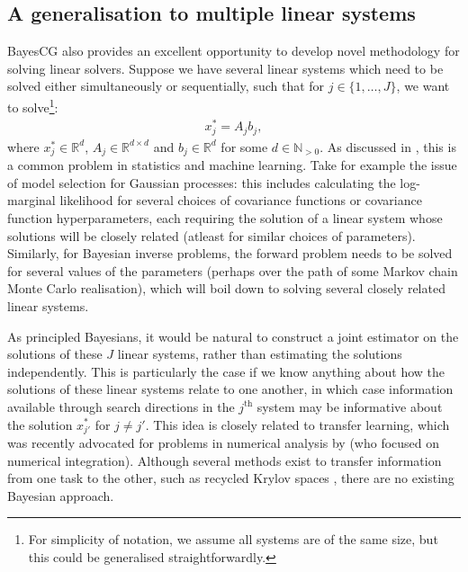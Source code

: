 \documentclass[twoside]{article}
\begin{document}


\subsection*{A generalisation to multiple linear systems}

BayesCG also provides an excellent opportunity to develop novel methodology for solving linear solvers. Suppose we have several linear systems which need to be solved either simultaneously or sequentially, such that for $j \in \{1,\ldots,J\}$, we want to solve\footnote{For simplicity of notation, we assume all systems are of the same size, but this could be generalised straightforwardly.}:
\begin{align*}
x_j^* = A_j b_j,  
\end{align*}
where $x_j^* \in \mathbb{R}^d$, $A_j \in \mathbb{R}^{d \times d}$ and $b_j \in \mathbb{R}^d$ for some $d \in \mathbb{N}_{> 0}$. As discussed in 
\cite{DeRoos2017}, this is a common problem in statistics and machine learning. Take for example the issue of model selection for Gaussian processes: this includes calculating the log-marginal likelihood for several choices of covariance functions or covariance function hyperparameters, each requiring the solution of a linear system whose solutions will be closely related (atleast for similar choices of parameters). Similarly, for Bayesian inverse problems, the forward problem needs to be solved for several values of the parameters (perhaps over the path of some Markov chain Monte Carlo realisation), which will boil down to solving several closely related linear systems.

As principled Bayesians, it would be natural to construct a joint estimator on the solutions of these $J$ linear systems, rather than estimating the solutions independently. This is particularly the case if we know anything about how the solutions of these linear systems relate to one another, in which case information available through search directions in the $j^{\text{th}}$ system may be informative about the solution $x^*_{j'}$ for $j \neq j'$. This idea is closely related to transfer learning, which was recently advocated for problems in numerical analysis by \cite{Xi2018MultiOutput} (who focused on numerical integration). Although several methods exist to transfer information from one task to the other, such as recycled Krylov spaces \citep{DeRoos2017}, there are no existing Bayesian approach. 
\end{document}
